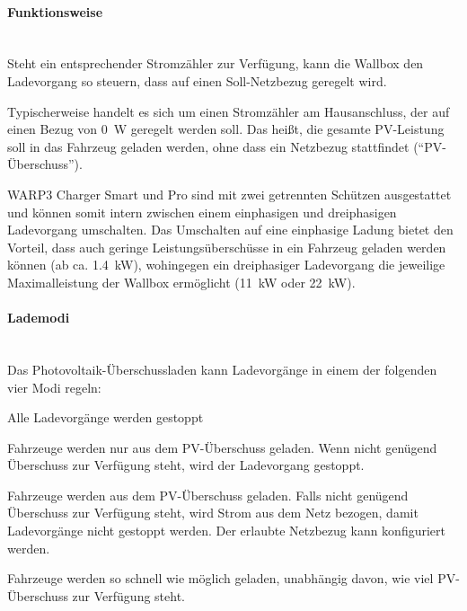\documentclass[a4paper,10pt]{article}
\begin{document}
\begin{multicols*}{2}
	\paragraph{Funktionsweise}\ \\
	Steht ein entsprechender Stromzähler zur Verfügung, kann die Wallbox den
	Ladevorgang so steuern, dass auf einen Soll-Netzbezug geregelt wird.

	Typischerweise handelt es sich um einen Stromzähler am Hausanschluss, der auf
	einen Bezug von \SI{0}{\watt} geregelt werden soll. Das heißt, die gesamte
	PV-Leistung soll in das Fahrzeug geladen werden, ohne dass ein Netzbezug
	stattfindet (\enquote{PV-Überschuss}).

	WARP3 Charger Smart und Pro sind mit zwei getrennten Schützen
	ausgestattet und können somit intern zwischen einem einphasigen und dreiphasigen
	Ladevorgang umschalten. Das Umschalten auf eine einphasige Ladung bietet den Vorteil, dass auch geringe
	Leistungsüberschüsse in ein Fahrzeug geladen werden können (ab ca.
	\SI{1,4}{\kilo\watt}), wohingegen ein dreiphasiger Ladevorgang die jeweilige
	Maximalleistung der Wallbox ermöglicht (\SI{11}{\kilo\watt} oder
	\SI{22}{\kilo\watt}).

	\paragraph{Lademodi}\ \\

	Das Photovoltaik-Überschussladen kann Ladevorgänge in einem der folgenden vier Modi regeln:

	\begin{description}[labelindent=0.5cm, leftmargin=0.5cm]
	 \item[Aus] Alle Ladevorgänge werden gestoppt
	 \item[PV] Fahrzeuge werden nur aus dem PV-Überschuss geladen.
               Wenn nicht genügend Überschuss zur Verfügung steht, wird der Ladevorgang gestoppt.
	 \item[Min+PV] Fahrzeuge werden aus dem PV-Überschuss geladen.
                   Falls nicht genügend Überschuss zur Verfügung steht, wird Strom aus dem Netz bezogen,
                   damit Ladevorgänge nicht gestoppt werden.
                   Der erlaubte Netzbezug kann konfiguriert werden.
     \item[Schnell] Fahrzeuge werden so schnell wie möglich geladen, unabhängig davon, wie viel PV-Überschuss zur Verfügung steht.
	\end{description}



\end{multicols*}
\end{document}
